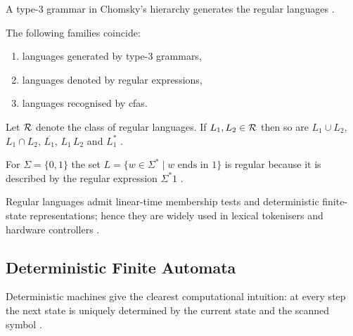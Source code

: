 \begin{concept}\label{concept:regular-grammar}
A type-3 grammar in Chomsky’s hierarchy generates the regular languages
\cite{Chomsky1959}.
\end{concept}

\begin{theorem}\label{thm:kleene}
The following families coincide:
\begin{enumerate}
  \item languages generated by type-3 grammars,
  \item languages denoted by regular expressions,
  \item languages recognised by \glspl{cfa}.
\end{enumerate}
\cite{Kleene1956}
\end{theorem}

\begin{proposition}\label{prop:closure}
Let ${\cal R}$ denote the class of regular languages.  
If $L_{1},L_{2}\in{\cal R}$ then so are
$L_{1}\cup L_{2}$, $L_{1}\cap L_{2}$, $\overline{L_{1}}$,
$L_{1}\,L_{2}$ and $L_{1}^{\ast}$  
\cite{HopcroftUllman1979}.
\end{proposition}

\begin{example}\label{ex:reg-lang}
For $\Sigma=\{0,1\}$ the set
$L=\{w\in\Sigma^{\ast}\mid w\text{ ends in }1\}$ is regular because it
is described by the regular expression $\Sigma^{\ast}1$
\cite{HopcroftUllman1979}.
\end{example}

\begin{observation}\label{obs:why-regular-matters}
Regular languages admit linear-time membership tests and deterministic
finite-state representations; hence they are widely used in lexical
tokenisers and hardware controllers \cite{AhoHopcroftUllman1974}.
\end{observation}

\subsection{Deterministic Finite Automata}\label{subsec:dfa}

Deterministic machines give the clearest computational intuition: at
every step the next state is uniquely determined by the current state
and the scanned symbol \cite{HopcroftUllman1979}.

